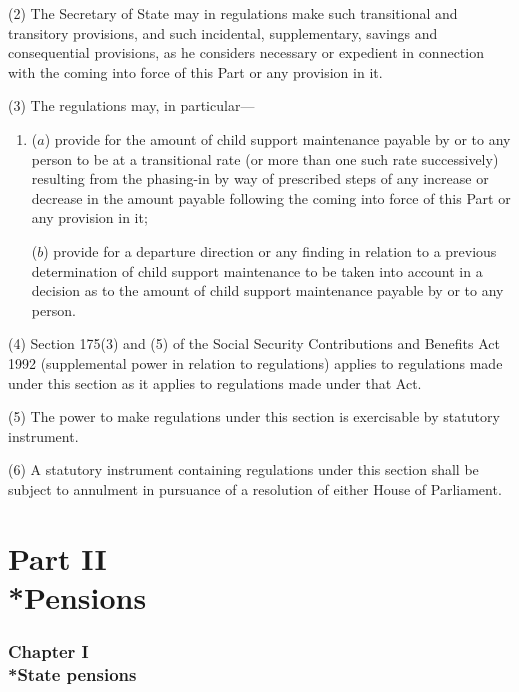 \documentclass[12pt,a4paper]{article}
\begin{document}
(2) The Secretary of State may in regulations make such transitional and transitory provisions, and such incidental, supplementary, savings and consequential provisions, as he considers necessary or expedient in connection with the coming into force of this Part or any provision in it.

(3) The regulations may, in particular—
\begin{enumerate}\item[]
($a$) provide for the amount of child support maintenance payable by or to any person to be at a transitional rate (or more than one such rate successively) resulting from the phasing-in by way of prescribed steps of any increase or decrease in the amount payable following the coming into force of this Part or any provision in it;

($b$) provide for a departure direction or any finding in relation to a previous determination of child support maintenance to be taken into account in a decision as to the amount of child support maintenance payable by or to any person.
\end{enumerate}

(4) Section 175(3)  and (5)  of the Social Security Contributions and Benefits Act 1992 (supplemental power in relation to regulations) applies to regulations made under this section as it applies to regulations made under that Act.

(5) The power to make regulations under this section is exercisable by statutory instrument.

(6) A statutory instrument containing regulations under this section shall be subject to annulment in pursuance of a resolution of either House of Parliament.


\part[Part II --- Pensions]{Part II\\*Pensions}

\section[Chapter I --- State pensions]{Chapter I\\*State pensions}

\renewcommand\parthead{--- Part II Chapter I}
\end{document}
